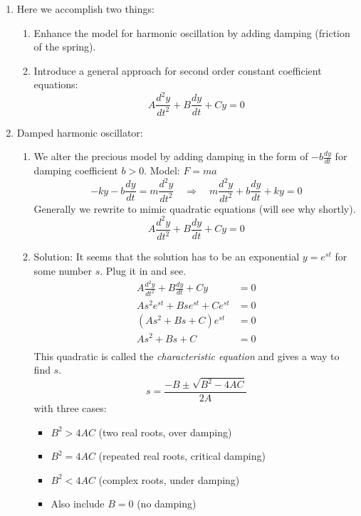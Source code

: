 \documentclass{article}
\newcommand{\ds}{\displaystyle}
\begin{document}
\begin{enumerate}

\item Here we accomplish two things:
\begin{enumerate}
\item Enhance the model for harmonic oscillation by adding damping (friction of the spring).
\item Introduce a general approach for second order constant coefficient equations:
\[
A \frac{d^2y}{dt^2} + B \frac{dy}{dt} + C y = 0
\]
\end{enumerate}


\item Damped harmonic oscillator:
\begin{enumerate}
\item We alter the precious model by adding damping in the form of $\ds -b \frac{dy}{dt}$ for damping coefficient $b>0$. Model: $F=ma$
\[
-ky - b \frac{dy}{dt} = m \frac{d^2y}{dt^2} \quad \Rightarrow \quad
m \frac{d^2y}{dt^2}+b \frac{dy}{dt}+ky = 0
\]
Generally we rewrite to mimic quadratic equations (will see why shortly).
\[
A \frac{d^2y}{dt^2} + B \frac{dy}{dt} + C y = 0
\]
\item Solution: It seems that the solution has to be an exponential $y=e^{st}$ for some number $s$. Plug it in and see.
\begin{align*}
A \frac{d^2y}{dt^2} + B \frac{dy}{dt} + C y &= 0 \\
A s^2 e^{st} + B s  e^{st} + C  e^{st} &= 0 \\
(A s^2 + B s  + C)  e^{st} &= 0 \\
A s^2 + B s  + C &= 0 \\
\end{align*}
This quadratic is called the \emph{characteristic equation} and gives a way to find $s$. 
\[
s = \frac{-B \pm \sqrt{B^2-4AC}}{2A}
\]
with three cases:
\begin{itemize}
\item $B^2 > 4AC$ (two real roots, over damping)
\item $B^2 = 4AC$ (repeated real roots, critical damping)
\item $B^2 < 4AC$ (complex roots, under damping)
\item Also include $B=0$ (no damping)
\end{itemize}

\end{enumerate}
\end{enumerate}
\end{document}
